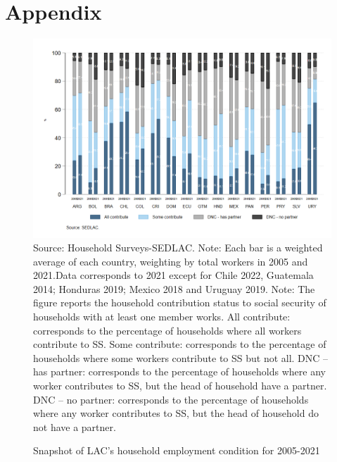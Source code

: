 \documentclass[english]{article}
\begin{document}
\section{Appendix}

\begin{landscape}
\begin{figure}[!htb]
    \centering
    \caption{Snapshot of LAC’s household employment condition for 2005-2021}     
    \includegraphics[scale=.45]{latex/figures/Household/snapshot_household_2005-2021.png}
    \label{fig:Household20052021}
    \justifying
    \footnotesize{Source: Household Surveys-SEDLAC.}
    \footnotesize{Note: Each bar is a weighted average of each country, weighting by total workers in 2005 and 2021.Data corresponds to 2021 except for Chile 2022, Guatemala 2014; Honduras 2019; Mexico 2018 and Uruguay 2019.}
    \footnotesize{Note: The figure reports the household contribution status to social security of households with at least one member works.   All contribute: corresponds to the percentage of households where all workers contribute to SS. Some contribute: corresponds to the percentage of households where some workers contribute to SS but not all. DNC – has partner: corresponds to the percentage of households where any worker contributes to SS, but the head of household have a partner. DNC – no partner: corresponds to the percentage of households where any worker contributes to SS, but the head of household do not have a partner.}
\end{figure}
\end{landscape}
\end{document}
